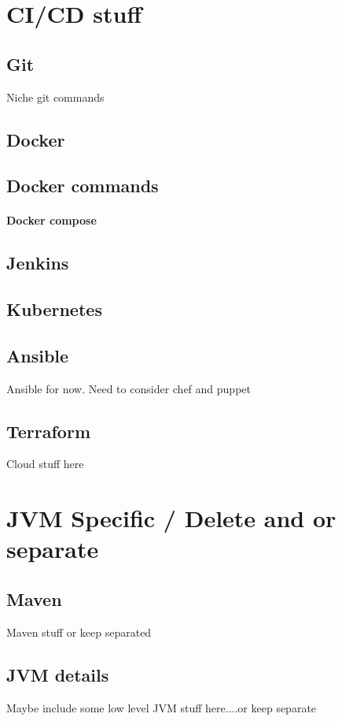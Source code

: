 \documentclass[a4paper, 11pt]{book}
\begin{document}
    \chapter{CI/CD stuff}

    \section{Git}

Niche git commands
    \section{Docker}
    \section{Docker commands}
    \subsubsection{Docker compose}

    \section{Jenkins}

    \section{Kubernetes}

    \section{Ansible}
Ansible for now. Need to consider chef and puppet
    \section{Terraform}
    Cloud stuff here

    \chapter{JVM Specific / Delete and or separate}
    \section{Maven}
    Maven stuff or keep separated
    \section{JVM details}
    Maybe include some low level JVM stuff here....or keep separate
\end{document}
